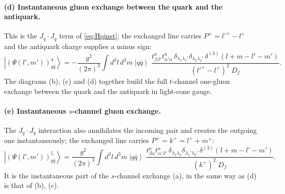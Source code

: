 \documentclass[11pt,a4paper]{article}
\numberwithin{equation}{section}
\newcommand{\ibar}[2]{\draw[line width=1.1pt] (#1-0.13,#2) -- (#1+0.13,#2);}
\newcommand{\ibarh}[2]{\draw[line width=1.1pt] (#1,#2-0.13) -- (#1,#2+0.13);}
\newcommand{\dthree}{\delta^{(3)}}
\newcommand{\ket}[1]{\left|#1\right\rangle}
\newcommand{\qk}[3]{q^{#1}_{#2}(#3)}
\newcommand{\aqk}[3]{\bar q^{#1}_{#2}(#3)}
\begin{document}
\paragraph{(d) Instantaneous gluon exchange between the quark and the antiquark.}
\begin{center}
\end{center}
This is the $J_{q}\cdot J_{q}$ term of \eqref{eq:Hqinst}; the exchanged line carries
$P^{+}=l'^{+}-l^{+}$ and the antiquark charge supplies a minus sign:
\begin{equation}
\ket{(\Psi(l',m'))^{4}_{q\bar q}}=-\frac{g^{2}}{(2\pi)^{3}}\int\!d^{3}l\,d^{3}m\;\ket{q\bar q}\;
\frac{t^{a}_{\beta\beta'}t^{a}_{\alpha'\alpha}\,\delta_{\lambda_{1}\lambda_{1}'}\delta_{\lambda_{2}\lambda_{2}'}\,
\dthree(l+m-l'-m')}{(l'^{+}-l^{+})^{2}\;D_{f}} .
\label{eq:D3d}
\end{equation}
The diagrams (b), (c) and (d) together build the full $t$-channel one-gluon exchange between the
quark and the antiquark in light-cone gauge.

\paragraph{(e) Instantaneous $s$-channel gluon exchange.}
\begin{center}
\end{center}
The $J_{q}\cdot J_{q}$ interaction also annihilates the incoming pair and creates the outgoing one
instantaneously; the exchanged line carries $P^{+}=k^{+}=l^{+}+m^{+}$:
\begin{equation}
\ket{(\Psi(l',m'))^{5}_{q\bar q}}=\frac{g^{2}}{(2\pi)^{3}}\int\!d^{3}l\,d^{3}m\;\ket{q\bar q}\;
\frac{t^{a}_{\beta\alpha}t^{a}_{\alpha'\beta'}\,\delta_{\lambda_{1}\lambda_{2}}\delta_{\lambda_{1}'\lambda_{2}'}\,
\dthree(l+m-l'-m')}{(k^{+})^{2}\;D_{f}} .
\label{eq:D3e}
\end{equation}
It is the instantaneous part of the $s$-channel exchange (a), in the same way as (d) is that of
(b), (c).
\end{document}
